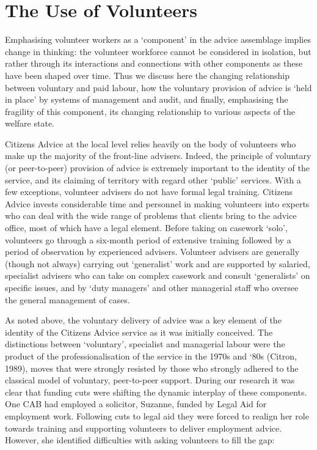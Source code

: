 \section{The Use of Volunteers}
Emphasising volunteer workers as a ‘component’ in the advice assemblage implies change in thinking: the volunteer workforce cannot be considered in isolation, but rather through its interactions and connections with other components as these have been shaped over time. Thus we discuss here the changing relationship between voluntary and paid labour, how the voluntary provision of advice is ‘held in place’ by systems of management and audit, and finally, emphasising the fragility of this component, its changing relationship to various aspects of the welfare state.
\par
Citizens Advice at the local level relies heavily on the body of volunteers who make up the majority of the front-line advisers. Indeed, the principle of voluntary (or peer-to-peer) provision of advice is extremely important to the identity of the service, and its claiming of territory with regard other ‘public’ services. With a few exceptions, volunteer advisers do not have formal legal training. Citizens Advice invests considerable time and personnel in making volunteers into experts who can deal with the wide range of problems that clients bring to the advice office, most of which have a legal element. Before taking on casework ‘solo’, volunteers go through a six-month period of extensive training followed by a period of observation by experienced advisers. Volunteer advisers are generally (though not always) carrying out ‘generalist’ work and are supported by salaried, specialist advisers who can take on complex casework and consult ‘generalists’ on specific issues, and by ‘duty managers’ and other managerial staff who oversee the general management of cases.
\par
As noted above, the voluntary delivery of advice was a key element of the identity of the Citizens Advice service as it was initially conceived. The distinctions between ‘voluntary’, specialist and managerial labour were the product of the professionalisation of the service in the 1970s and ‘80s (Citron, 1989), moves that were strongly resisted by those who strongly adhered to the classical model of voluntary, peer-to-peer support. During our research it was clear that funding cuts were shifting the dynamic interplay of these components. One CAB had employed a solicitor, Suzanne, funded by Legal Aid for employment work. Following cuts to legal aid they were forced to realign her role towards training and supporting volunteers to deliver employment advice. However, she identified difficulties with asking volunteers to fill the gap:
